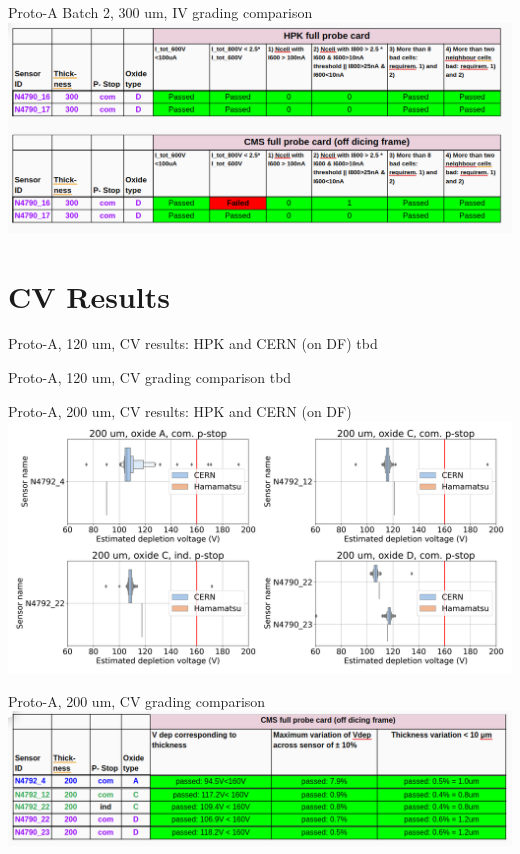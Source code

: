 \documentclass{beamer}
\begin{document}
\begin{frame}{Proto-A Batch 2, 300 um, IV grading comparison}
  \includegraphics[width=.8\textwidth]{plots/IV_grading_300um_2.png}
\end{frame}


\section{CV Results}

\begin{frame}{Proto-A, 120 um, CV results: HPK and CERN (on DF)}
  tbd
\end{frame}

\begin{frame}{Proto-A, 120 um, CV grading comparison}
  tbd
\end{frame}

\begin{frame}{Proto-A, 200 um, CV results: HPK and CERN (on DF)}
  \includegraphics[width=.8\textwidth]{plots/CV_ComparisonHPK_200um.png}
\end{frame}

\begin{frame}{Proto-A, 200 um, CV grading comparison}
  \includegraphics[width=.7\textwidth]{plots/CV_grading_200um.png}
\end{frame}
\end{document}
